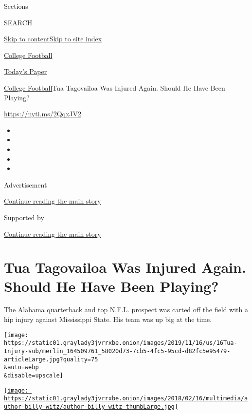 Sections

SEARCH

\protect\hyperlink{site-content}{Skip to
content}\protect\hyperlink{site-index}{Skip to site index}

\href{https://www.nytimes3xbfgragh.onion/section/sports/ncaafootball}{College
Football}

\href{https://myaccount.nytimes3xbfgragh.onion/auth/login?response_type=cookie\&client_id=vi}{}

\href{https://www.nytimes3xbfgragh.onion/section/todayspaper}{Today's
Paper}

\href{/section/sports/ncaafootball}{College Football}\textbar{}Tua
Tagovailoa Was Injured Again. Should He Have Been Playing?

\url{https://nyti.ms/2QqxJV2}

\begin{itemize}
\item
\item
\item
\item
\item
\end{itemize}

Advertisement

\protect\hyperlink{after-top}{Continue reading the main story}

Supported by

\protect\hyperlink{after-sponsor}{Continue reading the main story}

\hypertarget{tua-tagovailoa-was-injured-again-should-he-have-been-playing}{%
\section{Tua Tagovailoa Was Injured Again. Should He Have Been
Playing?}\label{tua-tagovailoa-was-injured-again-should-he-have-been-playing}}

The Alabama quarterback and top N.F.L. prospect was carted off the field
with a hip injury against Mississippi State. His team was up big at the
time.

\texttt{[image: https://static01.graylady3jvrrxbe.onion/images/2019/11/16/us/16Tua-Injury-sub/merlin\_164509761\_58020d73-7cb5-4fc5-95cd-d82fc5e95479-articleLarge.jpg?quality=75\\\&auto=webp\\\&disable=upscale]}

\href{https://www.nytimes3xbfgragh.onion/by/billy-witz}{\texttt{[image: https://static01.graylady3jvrrxbe.onion/images/2018/02/16/multimedia/author-billy-witz/author-billy-witz-thumbLarge.jpg]}}

